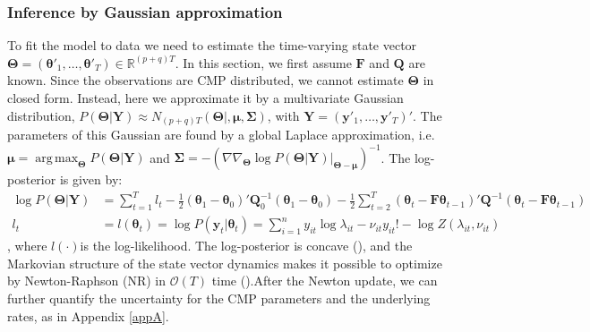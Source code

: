 \documentclass[aoas]{imsart}
\DeclareMathOperator*{\argmax}{arg\,max}
\theoremstyle{plain}
\theoremstyle{remark}
\begin{document}
\subsubsection{Inference by Gaussian approximation}
To fit the model to data we need to estimate the time-varying state vector $\bm{\Theta} = (\bm{\theta}'_1,\ldots,\bm{\theta}'_T)\in\mathbb{R}^{(p+q)T}$. In this section, we first assume $\bm{F}$ and $\bm{Q}$ are known. Since the observations are CMP distributed, we cannot estimate $\bm{\Theta}$ in closed form. Instead, here we approximate it by a multivariate Gaussian distribution, $P(\bm{\Theta|Y}) \approx N_{(p+q)T}(\bm{\Theta|,\mu,\Sigma})$, with $\bm{Y} = (\bm{y}'_1,\ldots, \bm{y}'_T)'$. The parameters of this Gaussian are found by a global Laplace approximation, i.e. $\bm{\mu} = \argmax_{\bm{\Theta}}P(\bm{\Theta|Y})$ and $\bm{\Sigma} = -(\nabla\nabla_{\bm{\Theta}}\log P(\bm{\Theta|Y})|_{\bm{\Theta - \mu}})^{-1}$. The log-posterior is given by:
\begin{align}
	\log P(\bm{\Theta|Y}) &= \sum_{t=1}^{T}l_t - \frac{1}{2}(\bm{\theta}_1 - \bm{\theta}_0)'\bm{Q}_0^{-1}(\bm{\theta}_1 - \bm{\theta}_0) - \frac{1}{2}\sum_{t=2}^{T}(\bm{\theta}_t - \bm{F\theta}_{t-1})'\bm{Q}^{-1}(\bm{\theta}_t - \bm{F\theta}_{t-1})\\
	l_t &= l(\bm{\theta}_t) = \log P(\bm{y}_t|\bm{\theta}_t) = \sum_{i=1}^{n}y_{it}\log \lambda_{it} - \nu_{it}y_{it}! - \log Z(\lambda_{it}, \nu_{it}) \nonumber
\end{align}
, where $l(\cdot)$is the log-likelihood. The log-posterior is concave (\cite{Gupta2014}), and the Markovian structure of the state vector dynamics makes it possible to optimize by Newton-Raphson (NR) in $\mathcal{O}(T)$ time (\cite{Paninski2010}).After the Newton update, we can further quantify the uncertainty for the CMP parameters and the underlying rates, as in Appendix \ref{appA}.
\end{document}
